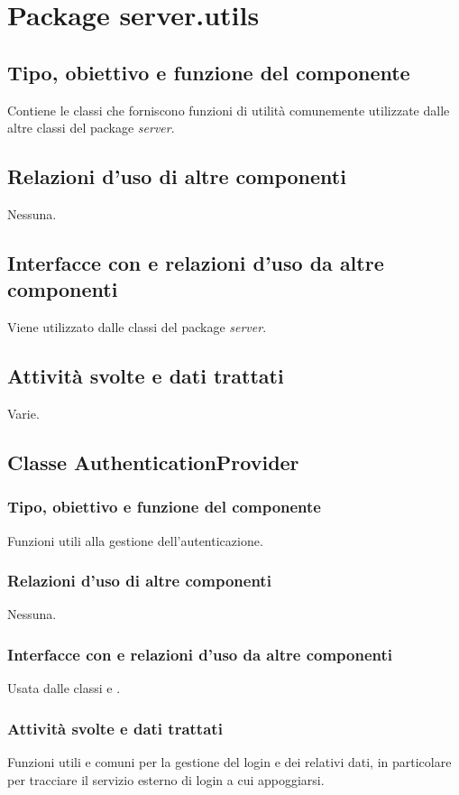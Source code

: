 \section{Package server.utils} %
\subsection*{Tipo, obiettivo e funzione del componente}
Contiene le classi che forniscono funzioni di utilit\`a comunemente utilizzate
dalle altre classi del package \emph{server}.
\subsection*{Relazioni d'uso di altre componenti}
Nessuna.
\subsection*{Interfacce con e relazioni d'uso da altre componenti}
Viene utilizzato dalle classi del package \emph{server}.
\subsection*{Attivit\`a svolte e dati trattati}
Varie.

\subsection{Classe AuthenticationProvider}
\subsubsection*{Tipo, obiettivo e funzione del componente}
Funzioni utili alla gestione dell'autenticazione.
\subsubsection*{Relazioni d'uso di altre componenti}
Nessuna.
\subsubsection*{Interfacce con e relazioni d'uso da altre componenti}
Usata dalle classi  e . 
\subsubsection*{Attivit\`a svolte e dati trattati}
Funzioni utili e comuni per la gestione del login e dei relativi dati, in
particolare per tracciare il servizio esterno di login a cui appoggiarsi.

